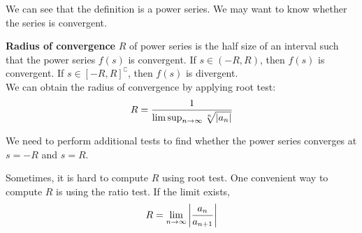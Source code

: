 \documentclass{huhtakm-template-book}
\begin{document}
We can see that the definition is a power series. We may want to know whether the series is convergent.
\begin{defn}
	\textbf{Radius of convergence} $R$ of power series is the half size of an interval such that the power series $f(s)$ is convergent. If $s\in(-R,R)$, then $f(s)$ is convergent. If $s\in[-R,R]^{\complement}$, then $f(s)$ is divergent.\\
	We can obtain the radius of convergence by applying root test:
	\begin{equation*}
		R=\frac{1}{\limsup_{n\to\infty}\sqrt[n]{\left|{a_{n}}\right|}}
	\end{equation*}
\end{defn}
\begin{rem}
	We need to perform additional tests to find whether the power series converges at $s=-R$ and $s=R$.
\end{rem}
\begin{rem}
	Sometimes, it is hard to compute $R$ using root test. One convenient way to compute $R$ is using the ratio test. If the limit exists,
	\begin{equation*}
		R=\lim_{n\to\infty}\left|{\frac{a_{n}}{a_{n+1}}}\right|
	\end{equation*}
\end{rem}
\end{document}
